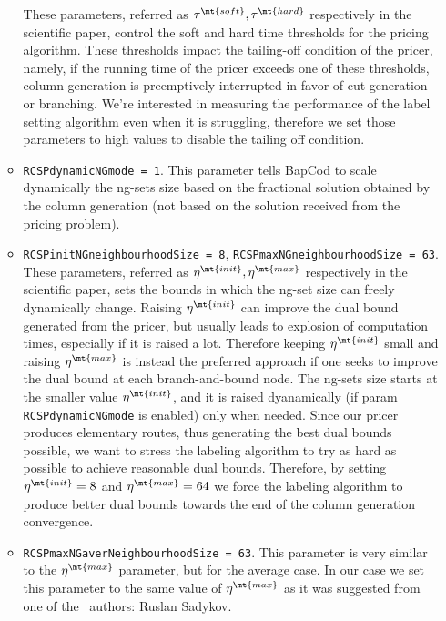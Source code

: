 \begin{itemize}
\begin{itemize}
		            These parameters, referred as $\tau^\mt{soft}, \tau^\mt{hard}$ respectively in the scientific paper,
		            control the soft and hard time thresholds for the pricing algorithm.
		            These thresholds impact the tailing-off condition of the pricer, namely, if the running time of the pricer exceeds one of these thresholds, column generation is preemptively interrupted in favor of cut generation or branching.
		            We're interested in measuring the performance of the label setting algorithm even when it is struggling, therefore we set those parameters to high values to disable the tailing off condition.
		      \item \texttt{RCSPdynamicNGmode = 1}.
		            This parameter tells BapCod to scale dynamically
		            the ng-sets size based on the
		            fractional solution obtained by the column generation
		            (not based on the solution received from the pricing problem).
		      \item \texttt{RCSPinitNGneighbourhoodSize = 8}, \texttt{RCSPmaxNGneighbourhoodSize = 63}.
		            These parameters, referred as $\eta^\mt{init}, \eta^\mt{max}$ respectively in the scientific paper,
		            sets the bounds in which the ng-set size can freely dynamically change.
		            Raising $\eta^\mt{init}$ can improve the dual bound generated from the pricer, but usually leads to explosion of computation times, especially if it is raised a lot.
		            Therefore keeping $\eta^\mt{init}$ small and raising $\eta^\mt{max}$ is instead the preferred approach if one seeks to improve the dual bound at each branch-and-bound node.
		            The ng-sets size starts at the smaller value $\eta^\mt{init}$, and it is raised dyanamically (if param \texttt{RCSPdynamicNGmode} is enabled) only when needed.
		            Since our pricer produces elementary routes, thus generating the best dual bounds possible, we want to stress the labeling algorithm to try as hard as possible to achieve
		            reasonable dual bounds. Therefore, by setting $\eta^\mt{init} = 8$ and $\eta^\mt{max} = 64$ we force the labeling algorithm to produce better dual bounds towards the end
		            of the column generation convergence.
		      \item \texttt{RCSPmaxNGaverNeighbourhoodSize = 63}.
		            This parameter is very similar to the $\eta^\mt{max}$ parameter, but for the average case.
		            In our case we set this parameter to the same value of $\eta^\mt{max}$ as it was suggested from one of the \bapcod\ authors: Ruslan Sadykov.

\end{itemize}
\end{itemize}
